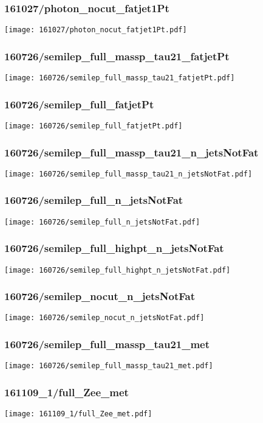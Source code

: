 \begin{frame}
   \frametitle{\small 161027/photon\_nocut\_fatjet1Pt}
   \centering
   \texttt{[image: 161027/photon\_nocut\_fatjet1Pt.pdf]}
\end{frame}

\begin{frame}
   \frametitle{\small 160726/semilep\_full\_massp\_tau21\_fatjetPt}
   \centering
   \texttt{[image: 160726/semilep\_full\_massp\_tau21\_fatjetPt.pdf]}
\end{frame}

\begin{frame}
   \frametitle{\small 160726/semilep\_full\_fatjetPt}
   \centering
   \texttt{[image: 160726/semilep\_full\_fatjetPt.pdf]}
\end{frame}

\begin{frame}
   \frametitle{\small 160726/semilep\_full\_massp\_tau21\_n\_jetsNotFat}
   \centering
   \texttt{[image: 160726/semilep\_full\_massp\_tau21\_n\_jetsNotFat.pdf]}
\end{frame}

\begin{frame}
   \frametitle{\small 160726/semilep\_full\_n\_jetsNotFat}
   \centering
   \texttt{[image: 160726/semilep\_full\_n\_jetsNotFat.pdf]}
\end{frame}

\begin{frame}
   \frametitle{\small 160726/semilep\_full\_highpt\_n\_jetsNotFat}
   \centering
   \texttt{[image: 160726/semilep\_full\_highpt\_n\_jetsNotFat.pdf]}
\end{frame}

\begin{frame}
   \frametitle{\small 160726/semilep\_nocut\_n\_jetsNotFat}
   \centering
   \texttt{[image: 160726/semilep\_nocut\_n\_jetsNotFat.pdf]}
\end{frame}

\begin{frame}
   \frametitle{\small 160726/semilep\_full\_massp\_tau21\_met}
   \centering
   \texttt{[image: 160726/semilep\_full\_massp\_tau21\_met.pdf]}
\end{frame}

\begin{frame}
   \frametitle{\small 161109\_1/full\_Zee\_met}
   \centering
   \texttt{[image: 161109\_1/full\_Zee\_met.pdf]}
\end{frame}

